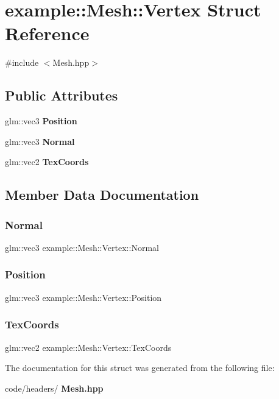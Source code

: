 \section{example\+::Mesh\+::Vertex Struct Reference}
\label{structexample_1_1_mesh_1_1_vertex}


{\ttfamily \#include $<$Mesh.\+hpp$>$}

\subsection*{Public Attributes}
\begin{DoxyCompactItemize}
\item 
glm\+::vec3 \textbf{ Position}
\item 
glm\+::vec3 \textbf{ Normal}
\item 
glm\+::vec2 \textbf{ Tex\+Coords}
\end{DoxyCompactItemize}


\subsection{Member Data Documentation}
\mbox{\label{structexample_1_1_mesh_1_1_vertex_ae977beac035826508c879148a360e3dc}} 
\subsubsection{Normal}
{\footnotesize\ttfamily glm\+::vec3 example\+::\+Mesh\+::\+Vertex\+::\+Normal}

\mbox{\label{structexample_1_1_mesh_1_1_vertex_a7cdd61e2b1d445432b2d3ba29b645d37}} 
\subsubsection{Position}
{\footnotesize\ttfamily glm\+::vec3 example\+::\+Mesh\+::\+Vertex\+::\+Position}

\mbox{\label{structexample_1_1_mesh_1_1_vertex_a367bb4427a81cea7682ce24f39974d2d}} 
\subsubsection{TexCoords}
{\footnotesize\ttfamily glm\+::vec2 example\+::\+Mesh\+::\+Vertex\+::\+Tex\+Coords}



The documentation for this struct was generated from the following file\+:\begin{DoxyCompactItemize}
\item 
code/headers/\textbf{ Mesh.\+hpp}\end{DoxyCompactItemize}
